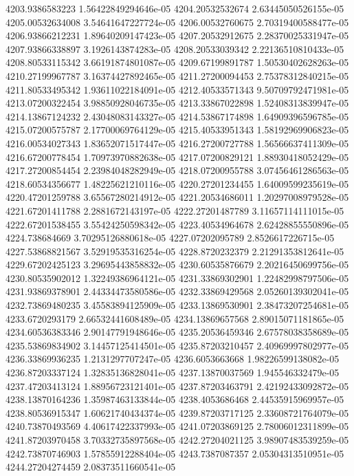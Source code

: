 {4203.9386583223 1.56422849294646e-05
4204.20532532674 2.63445050526155e-05
4205.00532634008 3.54641647227724e-05
4206.00532760675 2.70319400588477e-05
4206.93866212231 1.89640209147423e-05
4207.20532912675 2.28370025331947e-05
4207.93866338897 3.1926143874283e-05
4208.20533039342 2.22136510810433e-05
4208.80533115342 3.66191874801087e-05
4209.67199891787 1.50530402628263e-05
4210.27199967787 3.16374427892465e-05
4211.27200094453 2.75378312840215e-05
4211.80533495342 1.93611022184091e-05
4212.40533571343 9.50709792471981e-05
4213.07200322454 3.98850928046735e-05
4213.33867022898 1.52408313839947e-05
4214.13867124232 2.43048083143327e-05
4214.53867174898 1.64909396596785e-05
4215.07200575787 2.17700069764129e-05
4215.40533951343 1.58192969906823e-05
4216.00534027343 1.83652071517447e-05
4216.27200727788 1.56566637411309e-05
4216.67200778454 1.70973970882638e-05
4217.07200829121 1.88930418052429e-05
4217.27200854454 2.23984048282949e-05
4218.07200955788 3.07456461286563e-05
4218.60534356677 1.48225621210116e-05
4220.27201234455 1.64009599235619e-05
4220.47201259788 3.65567280214912e-05
4221.20534686011 1.20297008979528e-05
4221.67201411788 2.2881672143197e-05
4222.27201487789 3.11657114111015e-05
4222.67201538455 3.55424250598342e-05
4223.40534964678 2.62428855550896e-05
4224.738684669 3.70295126880618e-05
4227.07202095789 2.8526617226715e-05
4227.53868821567 3.52919535316254e-05
4228.8720232379 2.21291353812641e-05
4229.67202425123 3.29695443858832e-05
4230.60535876679 2.20216450699756e-05
4230.80535902012 1.32249386964121e-05
4231.33869302901 1.22482998797506e-05
4231.93869378901 2.44334473580586e-05
4232.33869429568 2.05260139302041e-05
4232.73869480235 3.45583894125909e-05
4233.13869530901 2.38473207254681e-05
4233.6720293179 2.66532441608489e-05
4234.13869657568 2.89015071181865e-05
4234.60536383346 2.90147791948646e-05
4235.20536459346 2.67578038358689e-05
4235.53869834902 3.14457125414501e-05
4235.87203210457 2.40969997802977e-05
4236.33869936235 1.2131297707247e-05
4236.6053663668 1.98226599138082e-05
4236.87203337124 1.32835136828041e-05
4237.13870037569 1.945546332479e-05
4237.47203413124 1.88956723121401e-05
4237.87203463791 2.42192433092872e-05
4238.13870164236 1.35987463133844e-05
4238.4053686468 2.44535915969957e-05
4238.80536915347 1.60621740434374e-05
4239.87203717125 2.33608721764079e-05
4240.73870493569 4.40617422337993e-05
4241.07203869125 2.78006012311899e-05
4241.87203970458 3.70332735897568e-05
4242.27204021125 3.98907483539259e-05
4242.73870746903 1.57855912288404e-05
4243.7387087357 2.05304313510951e-05
4244.27204274459 2.08373511660541e-05
}
